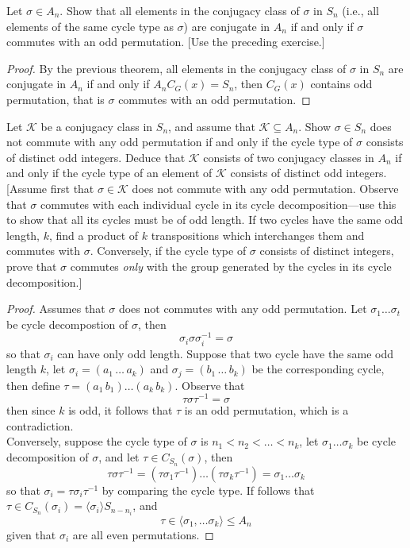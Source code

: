\documentclass{article}
\newenvironment{problem}[2][Problem]{\begin{trivlist}
\item[\hskip \labelsep {\bfseries #1}\hskip \labelsep {\bfseries #2.}]}{\end{trivlist}}
\begin{document}
\begin{problem}{20}
    Let \( \sigma \in A_n \). Show that all elements in the conjugacy class of \( \sigma \) in \( S_n \) (i.e., all elements of the same cycle type as \( \sigma \)) are conjugate in \( A_n \) if and only if \( \sigma \) commutes with an odd permutation. [Use the preceding exercise.]
\end{problem}
\begin{proof}
    By the previous theorem, all elements in the conjugacy class of \( \sigma \) in \( S_n \) are conjugate in \( A_n \) if and only if $A_nC_G(x)=S_n$, then $C_G(x)$ contains odd permutation, that is \( \sigma \) commutes with an odd permutation.
\end{proof}
\begin{problem}{21}
    Let \( \mathcal{K} \) be a conjugacy class in \( S_n \), and assume that \( \mathcal{K} \subseteq A_n \). Show \( \sigma \in S_n \) does not commute with any odd permutation if and only if the cycle type of \( \sigma \) consists of distinct odd integers. Deduce that \( \mathcal{K} \) consists of two conjugacy classes in \( A_n \) if and only if the cycle type of an element of \( \mathcal{K} \) consists of distinct odd integers. [Assume first that \( \sigma \in \mathcal{K} \) does not commute with any odd permutation. Observe that \( \sigma \) commutes with each individual cycle in its cycle decomposition—use this to show that all its cycles must be of odd length. If two cycles have the same odd length, \( k \), find a product of \( k \) transpositions which interchanges them and commutes with \( \sigma \). Conversely, if the cycle type of \( \sigma \) consists of distinct integers, prove that \( \sigma \) commutes \textit{only} with the group generated by the cycles in its cycle decomposition.]

\end{problem}
\begin{proof}
    Assumes that $\sigma$ does not commutes with any odd permutation. Let $\sigma_1\dots \sigma_t$ be cycle decompostion of $\sigma$, then 
    \[
        \sigma_i\sigma\sigma_i^{-1}=\sigma
    \]
    so that $\sigma_i$ can have only odd length. Suppose that two cycle have the same odd length $k$, let $\sigma_i=(a_1\, \dots \, a_k)$ and $\sigma_j = (b_1\, \dots\, b_k)$ be the corresponding cycle, then define $\tau =(a_1\, b_1)\dots (a_k\, b_k)$. Observe that
    \[
        \tau \sigma \tau^{-1}=\sigma 
    \]
    then since $k$ is odd, it follows that $\tau $ is an odd permutation, which is a contradiction. \\
    Conversely, suppose the cycle type of $\sigma$ is $n_1<n_2<\dots <n_k$, let $\sigma_1\dots \sigma_k$ be cycle decomposition of $\sigma$, and let $\tau \in C_{S_n}(\sigma)$, then
    \[
        \tau \sigma \tau^{-1} =(\tau \sigma_1\tau^{-1})\dots (\tau \sigma_k\tau^{-1}) = \sigma_1\dots \sigma_k
    \]
    so that $\sigma_i = \tau \sigma_i \tau^{-1}$ by comparing the cycle type. If follows that $\tau \in C_{S_n}(\sigma_i)= \langle \sigma_i\rangle S_{n-n_i}$, and 
    \[
        \tau \in \langle \sigma_1, \dots \sigma_k \rangle \leq A_n
    \]
    given that $\sigma_i$ are all even permutations. 
\end{proof}
\end{document}
